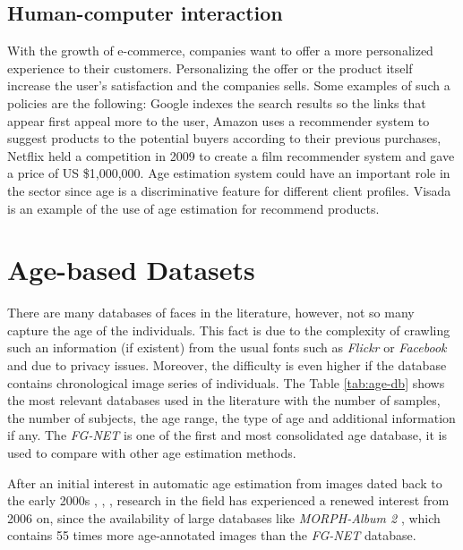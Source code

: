 \subsection{Human-computer interaction}
With the growth of e-commerce, companies want to offer a more personalized experience to their customers. Personalizing the offer or the product itself increase the user's satisfaction and the companies sells. Some examples of such a policies are the following: Google \cite{Brin:1998:ALH:297810.297827} indexes the search results so the links that appear first appeal more to the user, Amazon \cite{Linden:2003:ARI:642462.642471} uses a recommender system to suggest products to the potential buyers according to their previous purchases, Netflix \cite{Koren:2009:MFT:1608565.1608614} held a competition in 2009 to create a film recommender system and gave a price of US \$1,000,000. Age estimation system could have an important role in the sector since age is a discriminative feature for different client profiles. Visada \cite{visada} is an example of the use of age estimation for recommend products.


\section{Age-based Datasets} \label{sec:ageDB}
There are many databases of faces in the literature, however, not so many capture the age of the individuals. This fact is due to the complexity of crawling such an information (if existent) from the usual fonts such as \textit{Flickr} or \textit{Facebook} and due to privacy issues. Moreover, the difficulty is even higher if the database contains chronological image series of individuals. The Table \ref{tab:age-db} shows the most relevant databases used in the literature with the number of samples, the number of subjects, the age range, the type of age and additional information if any. The \textit{FG-NET} \cite{993553} is one of the first and most consolidated age database, it is used to compare with other age estimation methods.

After an initial interest in automatic age estimation from images dated back to the early 2000s \cite{Lanitis:2004:CDC:2225304.2226166}, \cite{993553}, \cite{palDB}, research in the field has experienced a renewed interest from 2006 on, since the availability of large databases like \textit{MORPH-Album 2} \cite{1613043}, which contains 55 times more age-annotated images than the \textit{FG-NET} database.

